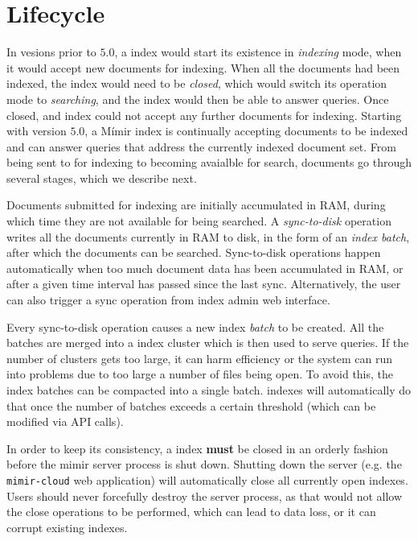 \section{\Mimir{} Lifecycle}

In vesions prior to $5.0$, a \Mimir{} index would start its existence in {\em
indexing} mode, when it would accept new documents for indexing. When all the
documents had been indexed, the index would need to be {\em closed}, which would
switch its operation mode to {\em searching}, and the index would then be able
to answer queries. Once closed, and index could not accept any further documents
for indexing. Starting with version $5.0$, a Mímir index is continually
accepting documents to be indexed and can answer queries that address the
currently indexed document set. From being sent to \Mimir{} for indexing to
becoming avaialble for search, documents go through several stages, which we
describe next.

Documents submitted for indexing are initially accumulated in RAM, during
which time they are not available for being searched. A {\em sync-to-disk}
operation writes all the documents currently in RAM to disk, in the form of an
{\em index batch}, after which the documents can be searched. Sync-to-disk
operations happen automatically when too much document data has been accumulated
in RAM, or after a given time interval has passed since the last sync.
Alternatively, the user can also trigger a sync operation from index admin web
interface.

Every sync-to-disk operation causes a new index {\em batch} to be created.
All the batches are merged into a index cluster which is then used to serve
queries. If the number of clusters gets too large, it can harm efficiency or the
system can run into problems due to too large a number of files being open. To
avoid this, the index batches can be compacted into a single batch. \Mimir{}
indexes will automatically do that once the number of batches exceeds a certain
threshold (which can be modified via API calls).

In order to keep its consistency, a \Mimir{} index {\bf must} be closed in an
orderly fashion before the mimir server process is shut down. Shutting down the
\Mimir{} server (e.g. the {\tt mimir-cloud} web application) will automatically
close all currently open indexes. Users should never forcefully destroy the
\Mimir{} server process, as that would not allow the close operations to be
performed, which can lead to data loss, or it can corrupt existing indexes.
